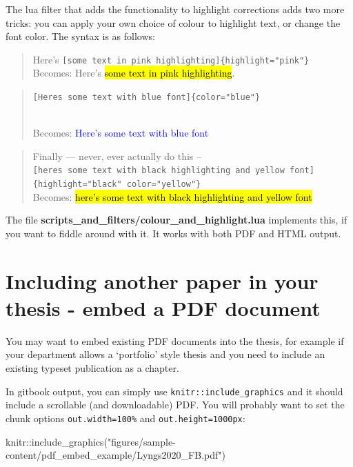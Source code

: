 \documentclass[a4paper, nobind]{templates/ociamthesis}
\newenvironment{Shaded}{\begin{snugshade}}{\end{snugshade}}
\newcommand{\FunctionTok}[1]{\textcolor[rgb]{0.00,0.00,0.00}{#1}}
\newcommand{\NormalTok}[1]{#1}
\newcommand{\SpecialCharTok}[1]{\textcolor[rgb]{0.00,0.00,0.00}{#1}}
\newcommand{\StringTok}[1]{\textcolor[rgb]{0.31,0.60,0.02}{#1}}
\renewenvironment{Shaded}
{
  \vspace{10pt}%
  \begin{snugshade}%
}{%
  \end{snugshade}%
  \vspace{8pt}%
}
\begin{document}
The lua filter that adds the functionality to highlight corrections adds two more tricks:
you can apply your own choice of colour to highlight text, or change the font color.
The syntax is as follows:

\begin{quote}
Here's \texttt{{[}some\ text\ in\ pink\ highlighting{]}\{highlight="pink"\}}\\
Becomes: Here's \hl{some text in pink highlighting}.
\end{quote}

\begin{quote}
\texttt{{[}Here\textquotesingle{}s\ some\ text\ with\ blue\ font{]}\{color="blue"\}}\strut \\
Becomes: \textcolor{blue}{Here's some text with blue font}
\end{quote}

\begin{quote}
Finally --- never, ever actually do this -- \texttt{{[}here\textquotesingle{}s\ some\ text\ with\ black\ highlighting\ and\ yellow\ font{]}\{highlight="black"\ color="yellow"\}}\\
Becomes: \textcolor{yellow}{\hl{here's some text with black highlighting and yellow font}}
\end{quote}

The file \textbf{scripts\_and\_filters/colour\_and\_highlight.lua} implements this, if you want to fiddle around with it.
It works with both PDF and HTML output.

\hypertarget{embed-pdf}{%
\section{Including another paper in your thesis - embed a PDF document}\label{embed-pdf}}

You may want to embed existing PDF documents into the thesis, for example if your department allows a `portfolio' style thesis and you need to include an existing typeset publication as a chapter.

In gitbook output, you can simply use \texttt{knitr::include\_graphics} and it should include a scrollable (and downloadable) PDF.
You will probably want to set the chunk options \texttt{out.width=\textquotesingle{}100\%\textquotesingle{}} and \texttt{out.height=\textquotesingle{}1000px\textquotesingle{}}:

\begin{Shaded}
\begin{Highlighting}[]
\NormalTok{knitr}\SpecialCharTok{::}\FunctionTok{include\_graphics}\NormalTok{(}\StringTok{"figures/sample{-}content/pdf\_embed\_example/Lyngs2020\_FB.pdf"}\NormalTok{)}
\end{Highlighting}
\end{Shaded}
\end{document}
